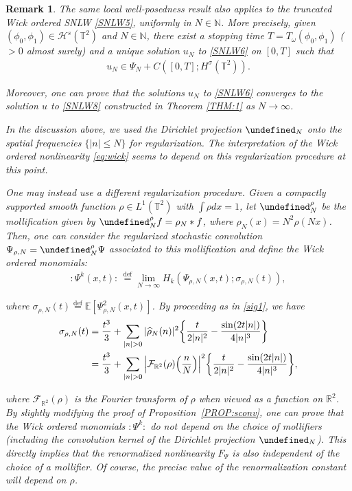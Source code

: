 \documentclass[letterpaper, 11pt,  reqno]{amsart}
\newtheorem{remark}[theorem]{Remark}
\newcommand{\1}{\hspace{0.5mm}\text{I}\hspace{0.5mm}}
\newcommand{\noi}{\noindent}
\newcommand{\R}{\mathbb{R}}
\newcommand{\T}{\mathbb{T}}
\let\P= \undefined
\newcommand{\P}{\mathbf{P}}
\newcommand{\E}{\mathbb{E}}
\newcommand{\F}{\mathcal{F}}
\newcommand{\eps}{\varepsilon}
\newcommand{\s}{\sigma}
\newcommand{\ft}{\widehat}
\renewcommand{\o}{\omega}
\newcommand{\N}{\mathbb{N}}
\renewcommand{\H}{\mathcal{H}}
\numberwithin{equation}{section}
\numberwithin{theorem}{section}
\begin{document}
\begin{remark}\label{REM:thm1} \rm
The same local well-posedness result
also applies to the truncated Wick ordered SNLW \eqref{SNLW5},
uniformly in $N \in \N$.
More precisely, given 
 $(\phi_0, \phi_1) \in \H^s(\T^2)$
and $N \in \N$, 
there exist
a stopping time $T = T_\o(\phi_0, \phi_1)$ ($>0$ almost surely)
and 
a unique solution $u_N $ to \eqref{SNLW6} on $[0, T]$
such that 
\begin{align*}
u_N \in  %
 \Psi_N + C([0, T]; H^\s(\T^2) ) .
\end{align*}
	

\noi
Moreover, 
one can prove that 
the solutions $u_N$ to \eqref{SNLW6} converges to the solution $u$ to \eqref{SNLW8}
constructed in Theorem \ref{THM:1} as $N \to \infty$.

In the discussion above, we used the Dirichlet projection $\P_N$
onto the spatial frequencies $\{|n|\leq N\}$
for regularization.
The interpretation of the Wick ordered nonlinearity \eqref{eq:wick}
seems to depend on this regularization procedure at this point.

One may instead use a different regularization procedure. 
Given a compactly supported smooth function $\rho \in L^1(\T^2)$ with $\int \rho dx = 1$,
let $\P^\rho_N$ be the mollification given by 
$\P^\rho_N f = \rho_N * f$,
where $\rho_N(x) = N^2\rho(N x)$.
Then, one can consider the regularized stochastic convolution 
$\Psi_{\rho, N}  = \P^\rho_N \Psi$
associated to this mollification
and define the Wick ordered monomials:
\begin{align*}
:\! \Psi^k (x, t) \!: \,      \stackrel{\text{def}}= \lim_{N\to \infty}   H_k(\Psi_{\rho, N}(x, t);\sigma_{\rho,N}(t)), 
\end{align*}

\noi
where $\sigma_{\rho,N}(t) \stackrel{\text{def}}{=} \E[\Psi_{\rho, N}^2(x, t)]$.
By proceeding as in \eqref{sig1}, we have
\begin{align*}
\s_{\rho, N}(t) 
& = \frac{t^3}{3} +  \sum_{ |n| >0} | \ft \rho_N(n)|^2 \bigg\{ \frac{t}{2 |n|^2} 
- \frac{\sin (2 t |n|)}{4|n|^3 }\bigg\} \notag\\
& = \frac{t^3}{3} +  \sum_{ |n| >0} \Big| \F_{\R^2}( \rho)\Big(\frac{n}{N}\Big)\Big|^2 \bigg\{ \frac{t}{2 |n|^2} 
- \frac{\sin (2 t |n|)}{4|n|^3 }\bigg\}, %
\end{align*}



\noi
where  $\F_{\R^2}( \rho)$ is the Fourier transform of $\rho$
when viewed as a function on $\R^2$.
By slightly modifying the proof of Proposition~\ref{PROP:sconv}, 
one can  prove that the Wick ordered monomials
$:\! \Psi^k  \!: $ do not depend on 
the choice of mollifiers (including the convolution kernel of the Dirichlet projection $\P_N$). 
This directly implies that the renormalized nonlinearity $F_\Psi$ is also 
independent of the choice of a mollifier. Of course, the precise value of the renormalization constant 
will depend on $\rho$.

\end{remark}
\end{document}
